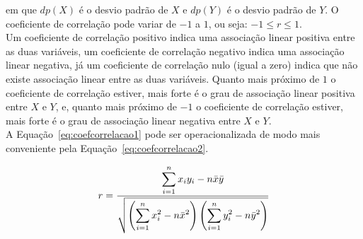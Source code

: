 \documentclass[11pt,fleqn]{book} %
\begin{document}
\vspace{0,2cm}
\noindent em que $dp(X)$ é o desvio padrão de $X$ e $dp(Y)$ é o desvio padrão de $Y$. O coeficiente de correlação pode variar de $-1$ a $1$, ou seja: $-1 \leq r \leq 1$. \\

Um coeficiente de correlação positivo indica uma associação linear positiva entre as duas variáveis, um coeficiente de correlação negativo indica uma associação linear negativa, já um coeficiente de correlação nulo (igual a zero) indica que não existe associação linear entre as duas variáveis. Quanto mais próximo de $1$ o coeficiente de correlação estiver, mais forte é o grau de associação linear positiva entre $X$ e $Y$, e, quanto mais próximo de $-1$ o coeficiente de correlação estiver, mais forte é o grau de associação linear negativa entre $X$ e $Y$. \\

A Equação~\ref{eq:coefcorrelacao1} pode ser operacionalizada de modo mais conveniente pela Equação~\ref{eq:coefcorrelacao2}. \\


\begin{eBox}
\vspace{-0.5cm}
\begin{equation} \label{eq:coefcorrelacao2}
\displaystyle r=\frac{\displaystyle\sum_{i=1}^{n}{x_i y_i}-n\bar{x}\bar{y}}
	 {\sqrt{\left(\displaystyle\sum_{i=1}^{n}{x_i^2}-n\bar{x}^2\right)
			\left(\displaystyle\sum_{i=1}^{n}{y_i^2}-n\bar{y}^2\right)}} \\
\end{equation}
\end{eBox}

\vspace{0,2cm}
\end{document}
